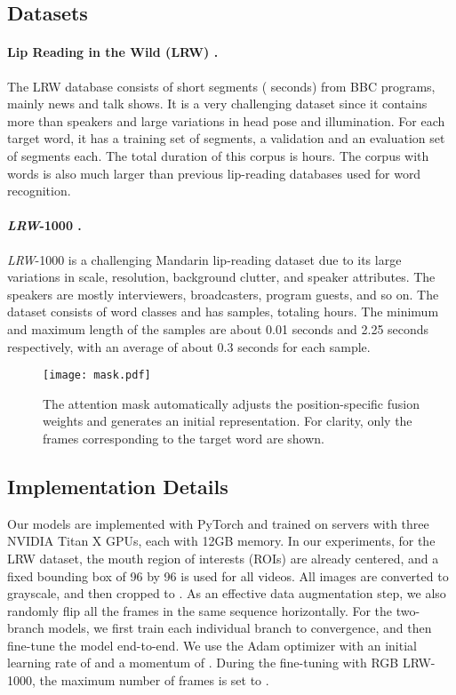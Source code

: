 \documentclass{bmvc2k}
\begin{document}
\subsection{Datasets}
\paragraph{Lip Reading in the Wild (LRW) \cite{chung2016lip}.}The LRW database consists of short segments ( seconds) from BBC programs, mainly news and talk shows. It is a very challenging dataset since it contains more than  speakers and large variations in head pose and illumination. For each target word, it has a training set of  segments, a validation and an evaluation set of  segments each. The total duration of this corpus is  hours. The corpus with  words is also much larger than previous lip-reading databases used for word recognition.

\paragraph{\textit{LRW}-1000 \cite{yang2018lrw}.}\textit{LRW}-1000 is a challenging Mandarin lip-reading dataset due to its large variations in scale, resolution, background clutter, and speaker attributes. The speakers are mostly interviewers, broadcasters, program guests, and so on. The dataset consists of  word classes and has  samples, totaling  hours. The minimum and maximum length of the samples are about 0.01 seconds and 2.25 seconds respectively, with an average of about 0.3 seconds for each sample.

\begin{figure*}
  \centering
  \centerline{\texttt{[image: mask.pdf]}}
\caption{The attention mask automatically adjusts the position-specific fusion weights and generates an initial representation. For clarity, only the frames corresponding to the target word are shown.}
\label{fig:mask}
\vspace{-1em}
\end{figure*}
\vspace{-1em}
\subsection{Implementation Details}
Our models are implemented with PyTorch and trained on servers with three NVIDIA Titan X GPUs, each with 12GB memory. In our experiments, for the LRW dataset, the mouth region of interests (ROIs) are already centered, and a fixed bounding box of 96 by 96 is used for all videos. All images are converted to grayscale, and then cropped to . As an effective data augmentation step, we also randomly flip all the frames in the same sequence horizontally. For the two-branch models, we first train each individual branch to convergence, and then fine-tune the model end-to-end. We use the Adam optimizer with an initial learning rate of  and a momentum of . During the fine-tuning with RGB LRW-1000, the maximum number of frames is set to .
\end{document}

